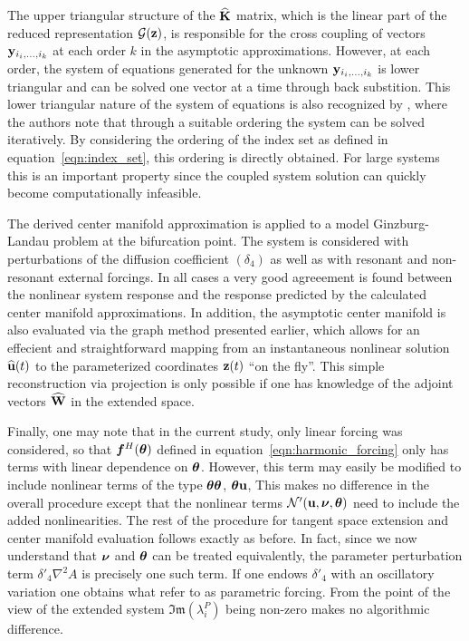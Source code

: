 The upper triangular structure of the $\mathbf{\widehat{K}}$ matrix, which is the linear part of the reduced representation $\mathcal{G}(\mathbf{z})$, is responsible for the cross coupling of vectors $\mathbf{y}_{i_{i},\ldots,i_{k}}$ at each order $k$ in the asymptotic approximations. However, at each order, the system of equations generated for the unknown $\mathbf{y}_{i_{i},\ldots,i_{k}}$ is lower triangular and can be solved one vector at a time through back substition. This lower triangular nature of the system of equations is also recognized by \citet{vizzaccaro24}, where the authors note that through a suitable ordering the system can be solved iteratively. By considering the ordering of the index set as defined in equation~\eqref{eqn:index_set}, this ordering is directly obtained. For large systems this is an important property since the coupled system solution can quickly become computationally infeasible.

 The derived center manifold approximation is applied to a model Ginzburg-Landau problem at the bifurcation point. The system is considered with perturbations of the diffusion coefficient $(\delta_{4})$ as well as with resonant and non-resonant external forcings. In all cases a very good agreeement is found between the nonlinear system response and the response predicted by the calculated center manifold approximations. In addition, the asymptotic center manifold is also evaluated via the graph method presented earlier, which allows for an effecient and straightforward mapping from an instantaneous nonlinear solution $\widehat{\mathbf{u}}(t)$ to the parameterized coordinates $\mathbf{z}(t)$ ``on the fly''. This simple reconstruction via projection is only possible if one has knowledge of the adjoint vectors $\widehat{\mathbf{W}}$ in the extended space. 
 
 Finally, one may note that in the current study, only linear forcing was considered, so that $\boldsymbol{f}^{H}(\boldsymbol{\theta})$ defined in equation~\eqref{eqn:harmonic_forcing} only has terms with linear dependence on $\boldsymbol{\theta}$. However, this term may easily be modified to include nonlinear terms of the type $\boldsymbol{\theta}\boldsymbol{\theta}$, $\boldsymbol{\theta}\mathbf{u}$, \etc This makes no difference in the overall procedure except that the nonlinear terms $\mathcal{N}'(\mathbf{u},\boldsymbol{\nu},\boldsymbol{\theta})$ need to include the added nonlinearities. The rest of the procedure for tangent space extension and center manifold evaluation follows exactly as before. In fact, since we now understand that $\boldsymbol{\nu}$ and $\boldsymbol{\theta}$ can be treated equivalently, the parameter perturbation term $\delta'_{4}\nabla^{2}A$ is precisely one such term. If one endows $\delta'_{4}$ with an oscillatory variation one obtains what \citet{thurnher24} refer to as parametric forcing. From the point of the view of the extended system $\mathfrak{Im}(\lambda^{P}_{i})$ being non-zero makes no algorithmic difference. 

